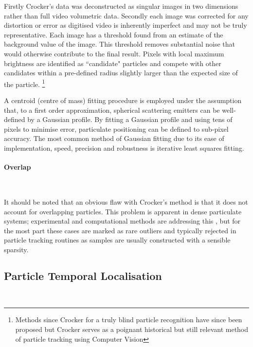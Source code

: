 Firstly Crocker's data was deconstructed as singular images in two dimensions rather than full video volumetric data. Secondly each image was corrected for any distortion or error as digitised video is inherently imperfect and may not be truly representative. Each image has a threshold found from an estimate of the background value of the image. This threshold removes substantial noise that would otherwise contribute to the final result. Pixels with local maximum brightness are identified as ``candidate" particles and compete with other candidates within a pre-defined radius slightly larger than the expected size of the particle. \footnote{Methods since Crocker for a truly blind particle recognition have since been proposed but Crocker serves as a poignant historical but still relevant method of particle tracking using Computer Vision}

A centroid (centre of mass) fitting procedure is employed under the assumption that, to a first order approximation, spherical scattering emitters can be well-defined by a Gaussian profile. By fitting a Gaussian profile and using tens of pixels to minimise error, particulate positioning can be defined to sub-pixel accuracy. The most common method of Gaussian fitting due to its ease of implementation, speed, precision and robustness is iterative least squares fitting.

\paragraph{Overlap}~

It should be noted that an obvious flaw with Crocker's method is that it does not account for overlapping particles. This problem is apparent in dense particulate systems; experimental and computational methods are addressing this \cite{Serge2008}, but for the most part these cases are marked as rare outliers and typically rejected in particle tracking routines as samples are usually constructed with a sensible sparsity.


\subsection{Particle Temporal Localisation}~


